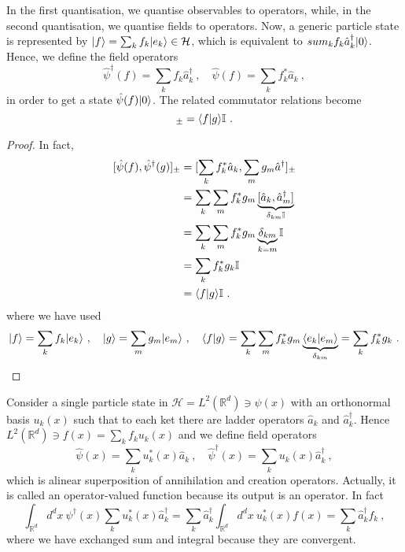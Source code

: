     In the first quantisation, we quantise observables to operators, while, in the second quantisation, we quantise fields to operators. Now, a generic particle state is represented by $\vert f\rangle = \sum_k f_k \vert e_k\rangle \in \mathcal H$, which is equivalent to $sum_k f_k \hat a_k^\dagger \vert0\rangle$. Hence, we define the field operators
    \begin{equation*}
        \hat \psi^\dagger (f) = \sum_k f_k \hat a^\dagger_k ~, \quad \hat \psi (f) = \sum_k f_k^* \hat a_k ~,
    \end{equation*}
    in order to get a state $\hat \psi (f) \vert0\rangle$. The related commutator relations become
    \begin{equation*}
        [\hat \psi (f), \hat \psi^\dagger (g)]_\pm = \braket{f}{g}\mathbb I ~.
    \end{equation*}
    \begin{proof}
        In fact,
        \begin{equation*}
        \begin{aligned}
            [\hat \psi (f), \hat \psi^\dagger (g)]_\pm & = [\sum_k f^*_k \hat a_k, \sum_m g_m \hat a^\dagger]_\pm \\ & = \sum_k \sum_m f^*_k g_m \underbrace{[\hat a_k, \hat a^\dagger_m]}_{\delta_{km} \mathbb I} \\ & = \sum_k \sum_m f^*_k g_m \underbrace{\delta_{km}}_{k= m} \mathbb I \\ & = \sum_k f^*_k g_k \mathbb I \\ & = \braket{f}{g} \mathbb I ~.
        \end{aligned}
        \end{equation*}
        where we have used 
        \begin{equation*}
            \vert f\rangle = \sum_k f_k \vert e_k\rangle ~, \quad \vert g\rangle = \sum_m g_m \vert e_m\rangle ~, \quad \langle f\vert g\rangle = \sum_k \sum_m f^*_k g_m \underbrace{\langle e_k\vert e_m\rangle}_{\delta_{km}} = \sum_k f^*_k g_k ~.
        \end{equation*}
    \end{proof}

    Consider a single particle state in $\mathcal H = L^2(\mathbb R^d) \ni \psi(x)$ with an orthonormal basis $u_k(x)$ such that to each ket there are ladder operators $\hat a_k$ and $\hat a_k^\dagger$. Hence $L^2(\mathbb R^d) \ni f(x) = \sum_k f_k u_k(x)$ and we define field operators
    \begin{equation*}
        \hat \psi(x) = \sum_k u_k^* (x) \hat a_k ~, \quad \hat \psi^\dagger (x) = \sum_k u_k (x) \hat a_k^\dagger ~,
    \end{equation*}
    which is alinear superposition of annihilation and creation operators. Actually, it is called an operator-valued function because its output is an operator. In fact 
    \begin{equation*}
        \int_{\mathbb R^d} d^d x ~ \psi^\dagger (x) \sum_k u_k^* (x) \hat a_k^\dagger = \sum_k \hat a_k^\dagger \int_{\mathbb R^d} d^d x ~ u^*_k(x) f(x) = \sum_k \hat a_k^\dagger f_k~,
    \end{equation*}
    where we have exchanged sum and integral because they are convergent. 

